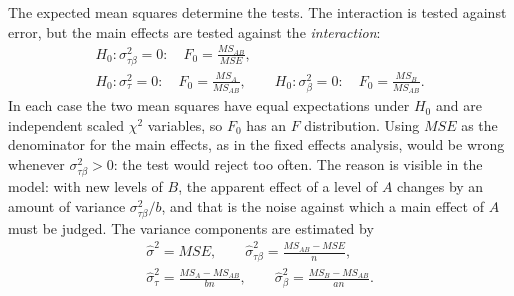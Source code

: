 \documentclass[11pt,a4paper]{article}
\numberwithin{equation}{section}
\theoremstyle{definition}
\begin{document}
The expected mean squares determine the tests. The interaction is tested against error, but the main effects are tested against the \emph{interaction}:
\begin{gather*}
H_0 : \sigma^2_{\tau\beta} = 0 : \quad F_0 = \frac{MS_{AB}}{MSE} , \\
H_0 : \sigma^2_\tau = 0 : \quad F_0 = \frac{MS_A}{MS_{AB}} , \qquad H_0 : \sigma^2_\beta = 0 : \quad F_0 = \frac{MS_B}{MS_{AB}} .
\end{gather*}
In each case the two mean squares have equal expectations under $H_0$ and are independent scaled $\chi^2$ variables, so $F_0$ has an $F$ distribution. Using
$MSE$ as the denominator for the main effects, as in the fixed effects analysis, would be wrong whenever $\sigma^2_{\tau\beta} > 0$: the test would reject too
often. The reason is visible in the model: with new levels of $B$, the apparent effect of a level of $A$ changes by an amount of variance $\sigma^2_{\tau\beta}/b$, and that
is the noise against which a main effect of $A$ must be judged. The variance components are estimated by
\begin{gather*}
\hat\sigma^2 = MSE , \qquad \hat\sigma^2_{\tau\beta} = \frac{MS_{AB} - MSE}n , \\
\hat\sigma^2_\tau = \frac{MS_A - MS_{AB}}{bn} , \qquad \hat\sigma^2_\beta = \frac{MS_B - MS_{AB}}{an} .
\end{gather*}
\end{document}
